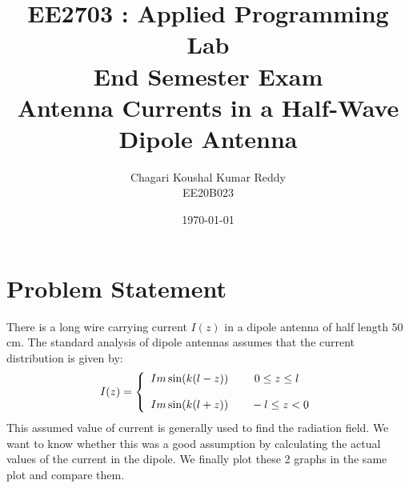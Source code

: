 \documentclass[12pt, a4paper]{article}
\title{\textbf{EE2703 : Applied Programming Lab \\  \vspace*{1cm} End Semester Exam \\ \vspace*{1cm} Antenna Currents in a Half-Wave Dipole Antenna}}
\author{Chagari Koushal Kumar Reddy \\ EE20B023} %
\date{\today} %
\begin{document}
		

\maketitle %
\clearpage

\tableofcontents
\clearpage

\section{Problem Statement}
There is a long wire carrying current $I(z)$ in a dipole antenna of half length $50$cm. The standard analysis of dipole antennas assumes that the current distribution is given by:
\begin{equation*}
    I(z) =    \left\{
        \begin{array}{ll}
              Im\sin(k(l-z)) \qquad      \   0 \le z \le l \vspace*{0.4cm} \\ 
              Im\sin(k(l+z)) \qquad       -l \le z < 0  
        \end{array} 
        \right. 
\end{equation*}
This assumed value of current is generally used to find the radiation field. We want to know whether this was a good assumption by calculating the actual values of the current in the dipole. We finally plot these 2 graphs in the same plot and compare them.
\end{document}
